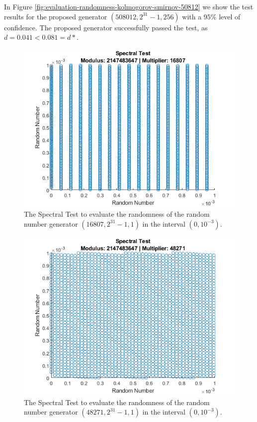 \begin{itemize}
	In Figure \ref{fig:evaluation-randomness-kolmogorov-smirnov-50812} we show the test results for the proposed generator $(508012,2^{31}-1, 256)$ with a $95\%$ level of confidence.
	The proposed generator successfully passed the test, as $d=0.041<0.081=d*$.
	
\end{itemize}

\begin{figure}
  \label{fig:evaluation-randomness-spectral-16807}
  \includegraphics[width=\columnwidth]{fig/evaluation-randomness-spectral-16807}
  \caption{The Spectral Test to evaluate the randomness of the random number generator $(16807,2^{31}-1, 1)$ in the interval $(0, 10^{-3})$.}
\end{figure}

\begin{figure}
	\label{fig:evaluation-randomness-spectral-48271}
	\includegraphics[width=\columnwidth]{fig/evaluation-randomness-spectral-48271}
	\caption{The Spectral Test to evaluate the randomness of the random number generator $(48271,2^{31}-1, 1)$ in the interval $(0, 10^{-3})$.}
\end{figure}

